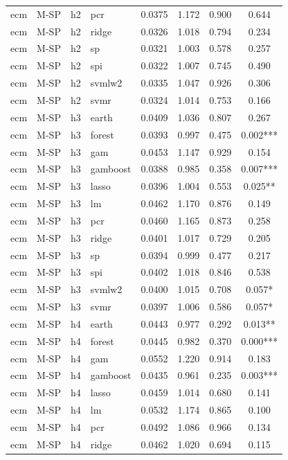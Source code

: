 \begin{ThreePartTable}
\begin{longtable}[t]{llclcccc}
ecm & M-SP & h2 & pcr & 0.0375 & 1.172 & 0.900 & 0.644\\
ecm & M-SP & h2 & ridge & 0.0326 & 1.018 & 0.794 & 0.234\\
ecm & M-SP & h2 & sp & 0.0321 & 1.003 & 0.578 & 0.257\\
ecm & M-SP & h2 & spi & 0.0322 & 1.007 & 0.745 & 0.490\\
ecm & M-SP & h2 & svmlw2 & 0.0335 & 1.047 & 0.926 & 0.306\\
ecm & M-SP & h2 & svmr & 0.0324 & 1.014 & 0.753 & 0.166\\
\addlinespace
ecm & M-SP & h3 & earth & 0.0409 & 1.036 & 0.807 & 0.267\\
ecm & M-SP & h3 & forest & 0.0393 & 0.997 & 0.475 & 0.002***\\
ecm & M-SP & h3 & gam & 0.0453 & 1.147 & 0.929 & 0.154\\
ecm & M-SP & h3 & gamboost & 0.0388 & 0.985 & 0.358 & 0.007***\\
ecm & M-SP & h3 & lasso & 0.0396 & 1.004 & 0.553 & 0.025**\\
ecm & M-SP & h3 & lm & 0.0462 & 1.170 & 0.876 & 0.149\\
ecm & M-SP & h3 & pcr & 0.0460 & 1.165 & 0.873 & 0.258\\
ecm & M-SP & h3 & ridge & 0.0401 & 1.017 & 0.729 & 0.205\\
ecm & M-SP & h3 & sp & 0.0394 & 0.999 & 0.477 & 0.217\\
ecm & M-SP & h3 & spi & 0.0402 & 1.018 & 0.846 & 0.538\\
ecm & M-SP & h3 & svmlw2 & 0.0400 & 1.015 & 0.708 & 0.057*\\
ecm & M-SP & h3 & svmr & 0.0397 & 1.006 & 0.586 & 0.057*\\
\addlinespace
ecm & M-SP & h4 & earth & 0.0443 & 0.977 & 0.292 & 0.013**\\
ecm & M-SP & h4 & forest & 0.0445 & 0.982 & 0.370 & 0.000***\\
ecm & M-SP & h4 & gam & 0.0552 & 1.220 & 0.914 & 0.183\\
ecm & M-SP & h4 & gamboost & 0.0435 & 0.961 & 0.235 & 0.003***\\
ecm & M-SP & h4 & lasso & 0.0459 & 1.014 & 0.680 & 0.141\\
ecm & M-SP & h4 & lm & 0.0532 & 1.174 & 0.865 & 0.100\\
ecm & M-SP & h4 & pcr & 0.0492 & 1.086 & 0.966 & 0.134\\
ecm & M-SP & h4 & ridge & 0.0462 & 1.020 & 0.694 & 0.115\\

\end{longtable}
\end{ThreePartTable}
